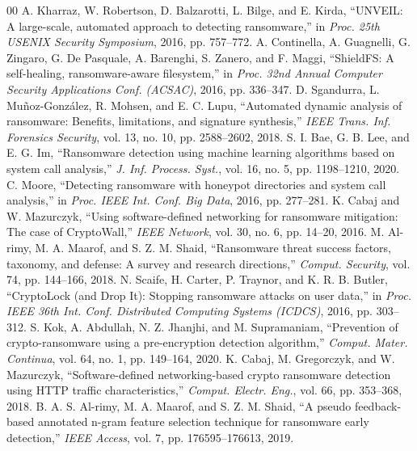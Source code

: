 \documentclass[conference]{IEEEtran}
\begin{document}
\begin{thebibliography}{00}
 A. Kharraz, W. Robertson, D. Balzarotti, L. Bilge, and E. Kirda, ``UNVEIL: A large-scale, automated approach to detecting ransomware,'' in \textit{Proc. 25th USENIX Security Symposium}, 2016, pp. 757--772.
 A. Continella, A. Guagnelli, G. Zingaro, G. De Pasquale, A. Barenghi, S. Zanero, and F. Maggi, ``ShieldFS: A self-healing, ransomware-aware filesystem,'' in \textit{Proc. 32nd Annual Computer Security Applications Conf. (ACSAC)}, 2016, pp. 336--347.
 D. Sgandurra, L. Mu{\~n}oz-Gonz{\'a}lez, R. Mohsen, and E. C. Lupu, ``Automated dynamic analysis of ransomware: Benefits, limitations, and signature synthesis,'' \textit{IEEE Trans. Inf. Forensics Security}, vol. 13, no. 10, pp. 2588--2602, 2018.
 S. I. Bae, G. B. Lee, and E. G. Im, ``Ransomware detection using machine learning algorithms based on system call analysis,'' \textit{J. Inf. Process. Syst.}, vol. 16, no. 5, pp. 1198--1210, 2020.
 C. Moore, ``Detecting ransomware with honeypot directories and system call analysis,'' in \textit{Proc. IEEE Int. Conf. Big Data}, 2016, pp. 277--281.
 K. Cabaj and W. Mazurczyk, ``Using software-defined networking for ransomware mitigation: The case of CryptoWall,'' \textit{IEEE Network}, vol. 30, no. 6, pp. 14--20, 2016.
 M. Al-rimy, M. A. Maarof, and S. Z. M. Shaid, ``Ransomware threat success factors, taxonomy, and defense: A survey and research directions,'' \textit{Comput. Security}, vol. 74, pp. 144--166, 2018.
 N. Scaife, H. Carter, P. Traynor, and K. R. B. Butler, ``CryptoLock (and Drop It): Stopping ransomware attacks on user data,'' in \textit{Proc. IEEE 36th Int. Conf. Distributed Computing Systems (ICDCS)}, 2016, pp. 303--312.
 S. Kok, A. Abdullah, N. Z. Jhanjhi, and M. Supramaniam, ``Prevention of crypto-ransomware using a pre-encryption detection algorithm,'' \textit{Comput. Mater. Continua}, vol. 64, no. 1, pp. 149--164, 2020.
 K. Cabaj, M. Gregorczyk, and W. Mazurczyk, ``Software-defined networking-based crypto ransomware detection using HTTP traffic characteristics,'' \textit{Comput. Electr. Eng.}, vol. 66, pp. 353--368, 2018.
 B. A. S. Al-rimy, M. A. Maarof, and S. Z. M. Shaid, ``A pseudo feedback-based annotated n-gram feature selection technique for ransomware early detection,'' \textit{IEEE Access}, vol. 7, pp. 176595--176613, 2019.

\end{thebibliography}
\end{document}
